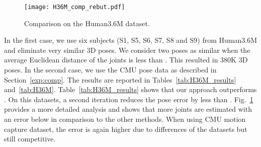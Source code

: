 \documentclass[10pt,twocolumn,letterpaper]{article}
\begin{document}
\begin{table*}[t]
\centering
{}
\caption{The average 3D pose error (mm) on the Human3.6M dataset for all actions of subject S11.}
\vspace{-4mm}
\label{tab:H36M}
\end{table*}
\begin{figure}[t]
\begin{center}
\texttt{[image: H36M\_comp\_rebut.pdf]}
\end{center}
   \vspace{-2mm}	
   \caption{Comparison on the Human3.6M dataset.}
\label{fig:H36M}
\end{figure}
In the first case, we use six subjects (S1, S5, S6, S7, S8 and S9) from Human3.6M and eliminate very similar 3D poses. We consider two poses as similar when the average Euclidean distance of the joints is less than . This resulted in 380K 3D poses. In the second case, we use the CMU pose data as described in Section~\ref{exp:comp}. The results are reported in Tables~\ref{tab:H36M_results} and~\ref{tab:H36M}. Table~\ref{tab:H36M_results} shows that our approach outperforms \cite{Ilya_2014,Bo-2010}. 
On this datasets, a second iteration reduces the pose error by less than .
Fig.~\ref{fig:H36M} provides a more detailed analysis and shows that more joints are estimated with an error below  in comparison to the other methods. When using CMU motion capture dataset, the error is again higher due to differences of the datasets but still competitive.
\end{document}
